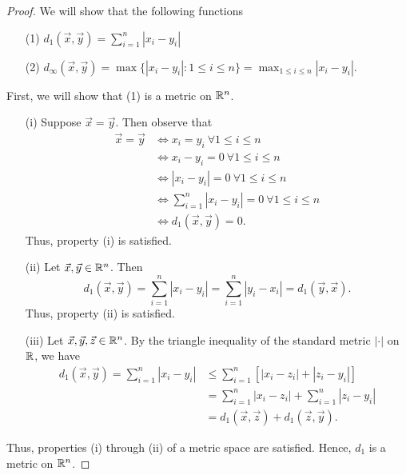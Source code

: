 \documentclass[a4paper]{article}
\begin{document}
\begin{proof}
We will show that the following functions
\begin{enumerate}
    \item[(1)]  \( {d}_{1}(\vec{ x } , \vec{ y } ) = \displaystyle \sum_{ i=1  }^{ n } | {x}_{i} - {y}_{i} |  \) 
    \item[(2)] \( {d}_{\infty }(\vec{ x } , \vec{ y } ) = \max \{ | {x}_{i} - {y}_{i} | : 1 \leq i \leq n  \} = \max_{1 \leq i \leq n} | {x}_{i} - {y}_{i} |     \).
\end{enumerate}

First, we will show that (1) is a metric on \( \mathbb{R}^{n} \). 
\begin{enumerate}
    \item[(i)] Suppose \( \vec{ x }  = \vec{ y }  \). Then observe that 
        \begin{align*}
            \vec{ x }  = \vec{ y } &\iff {x}_{i} = {y}_{i} \ \forall 1 \leq i \leq n \\
                                   &\iff {x}_{i} - {y}_{i} = 0 \ \forall 1 \leq i \leq n \\
                                   &\iff | {x}_{i} - {y}_{i} |  = 0 \ \forall 1 \leq i \leq n \\
                                   &\iff \sum_{ i=1  }^{ n } | {x}_{i} - {y}_{i} | = 0 \  \forall 1 \leq i \leq n \\
                                   &\iff {d}_{1}(\vec{ x } , \vec{ y } ) = 0. 
        \end{align*}
        Thus, property (i) is satisfied.
    \item[(ii)] Let \( \vec{ x } , \vec{ y }  \in \mathbb{R}^{n} \). Then 
        \[  {d}_{1}(\vec{ x } , \vec{ y } ) = \sum_{ i=1  }^{ n } | {x}_{i} - {y}_{i} |  = \sum_{ i=1  }^{ n } | {y}_{i} - {x}_{i} | = {d}_{1}(\vec{ y } , \vec{ x } ). \]
        Thus, property (ii) is satisfied.
    \item[(iii)] Let \( \vec{ x } , \vec{ y }, \vec{ z }  \in \mathbb{R}^{n} \). By the triangle inequality of the standard metric \( | \cdot |  \) on \( \mathbb{R} \), we have 
        \begin{align*}
            {d}_{1}(\vec{ x } , \vec{ y } ) = \sum_{ i=1  }^{ n } | {x}_{i} - {y}_{i} | &\leq \sum_{ i=1  }^{ n } [ | {x}_{i} - {z}_{i} |  + | {z}_{i} - {y}_{i} | ] \\
                                                                                        &= \sum_{ i=1  }^{ n } | {x}_{i} - {z}_{i} |  + \sum_{ i=1  }^{ n } | {z}_{i} - {y}_{i} |  \\
                                                                                        &= {d}_{1}(\vec{ x } , \vec{ z } ) + {d}_{1}(\vec{ z } , \vec{ y } ).
        \end{align*}
\end{enumerate}
Thus, properties (i) through (ii) of a metric space are satisfied. Hence, \( {d}_{1} \) is a metric on \( \mathbb{R}^{n} \).


\end{proof}
\end{document}
